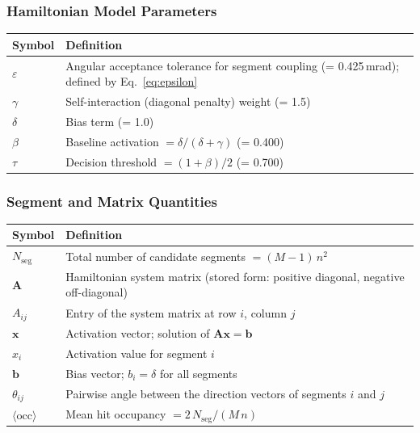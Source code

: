 \documentclass[12pt,a4paper]{article}
\newcommand{\eps}{\varepsilon}
\newcommand{\baseline}{\beta}  %
\newcommand{\thr}{\tau}        %
\begin{document}
\bigskip
\subsubsection*{Hamiltonian Model Parameters}
\begin{tabular}{@{}lp{10.5cm}@{}}
  \toprule
  Symbol & Definition \\
  \midrule
  $\eps$ & Angular acceptance tolerance for segment coupling (= 0.425\,mrad); defined by Eq.~\eqref{eq:epsilon} \\
  $\gamma$ & Self-interaction (diagonal penalty) weight (= 1.5) \\
  $\delta$ & Bias term (= 1.0) \\
  $\baseline$ & Baseline activation $= \delta/(\delta+\gamma)$ (= 0.400) \\
  $\thr$ & Decision threshold $= (1+\baseline)/2$ (= 0.700) \\
  \bottomrule
\end{tabular}

\bigskip
\subsubsection*{Segment and Matrix Quantities}
\begin{tabular}{@{}lp{10.5cm}@{}}
  \toprule
  Symbol & Definition \\
  \midrule
  $N_\text{seg}$ & Total number of candidate segments $= (M-1)\,n^2$ \\
  $\mathbf{A}$ & Hamiltonian system matrix (stored form: positive diagonal, negative off-diagonal) \\
  $A_{ij}$ & Entry of the system matrix at row $i$, column $j$ \\
  $\mathbf{x}$ & Activation vector; solution of $\mathbf{A}\mathbf{x} = \mathbf{b}$ \\
  $x_i$ & Activation value for segment $i$ \\
  $\mathbf{b}$ & Bias vector; $b_i = \delta$ for all segments \\
  $\theta_{ij}$ & Pairwise angle between the direction vectors of segments $i$ and $j$ \\
  $\langle\text{occ}\rangle$ & Mean hit occupancy $= 2\,N_\text{seg}/(M\,n)$ \\
  \bottomrule
\end{tabular}

\bigskip
\end{document}
